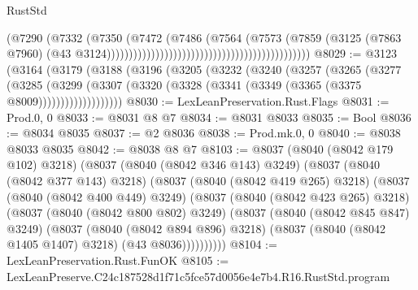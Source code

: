 \begin{lexlean}{RustStd}
\begin{coremodule}
                                                                            (@7290
                                                                              (@7332
                                                                                (@7350
                                                                                  (@7472
                                                                                    (@7486
                                                                                      (@7564
                                                                                        (@7573
                                                                                          (@7859
                                                                                            (@3125
                                                                                              (@7863
                                                                                                @7960)
                                                                                              (@43
                                                                                                @3124))))))))))))))))))))))))))))))))))))))))))))))
@8029 := @3123
    (@3164
      (@3179
        (@3188
          (@3196
            (@3205
              (@3232
                (@3240
                  (@3257
                    (@3265
                      (@3277
                        (@3285
                          (@3299
                            (@3307
                              (@3320 (@3328 (@3341 (@3349 (@3365 (@3375 @8009)))))))))))))))))))
@8030 := LexLeanPreservation.Rust.Flags
@8031 := Prod.{0, 0}
@8033 := @8031 @8 @7
@8034 := @8031 @8033
@8035 := Bool
@8036 := @8034 @8035
@8037 := @2 @8036
@8038 := Prod.mk.{0, 0}
@8040 := @8038 @8033 @8035
@8042 := @8038 @8 @7
@8103 := @8037
    (@8040 (@8042 @179 @102) @3218)
    (@8037
      (@8040 (@8042 @346 @143) @3249)
      (@8037
        (@8040 (@8042 @377 @143) @3218)
        (@8037
          (@8040 (@8042 @419 @265) @3218)
          (@8037
            (@8040 (@8042 @400 @449) @3249)
            (@8037
              (@8040 (@8042 @423 @265) @3218)
              (@8037
                (@8040 (@8042 @800 @802) @3249)
                (@8037
                  (@8040 (@8042 @845 @847) @3249)
                  (@8037
                    (@8040 (@8042 @894 @896) @3218)
                    (@8037 (@8040 (@8042 @1405 @1407) @3218) (@43 @8036))))))))))
@8104 := LexLeanPreservation.Rust.FunOK
@8105 := LexLeanPreserve.C24c187528d1f71c5fce57d0056e4e7b4.R16.RustStd.program

\end{coremodule}
\end{lexlean}
